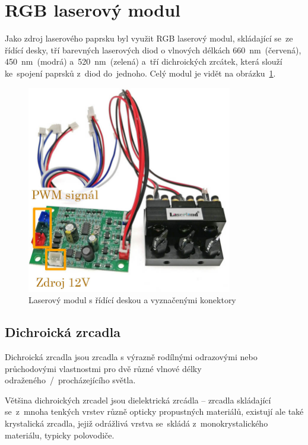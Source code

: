 \section{RGB laserový modul}
Jako zdroj laserového paprsku byl využit RGB laserový modul, skládající se~ze řídící desky, tří barevných laserových diod o vlnových délkách 660~nm~(červená), 450~nm~(modrá) a~520~nm~(zelená) a~tří dichroických zrcátek, která slouží ke~spojení paprsků z~diod do~jednoho. Celý modul je vidět na obrázku~\ref{fig:hw_laser-module}.


\begin{figure}[htb]
  \centering
  \includegraphics[width=0.8\textwidth]{img/hw_laser-module.jpg}
  \caption{\label{fig:hw_laser-module} Laserový modul s řídící deskou a vyznačenými konektory}
\end{figure}

\subsection{Dichroická zrcadla~\cite{dichroic-mirrors}}

Dichroická zrcadla jsou zrcadla s výrazně rodílnými odrazovými nebo průchodovými vlastnostmi pro dvě různé vlnové délky odraženého~/~procházejícího světla.

Většina dichroických zrcadel jsou dielektrická zrcádla -- zrcadla skládající se~z~mnoha tenkých vrstev různě opticky propustných materiálů, existují ale také krystalická zrcadla, jejiž odrážlivá vrstva se~skládá z~monokrystalického materiálu, typicky polovodiče.

